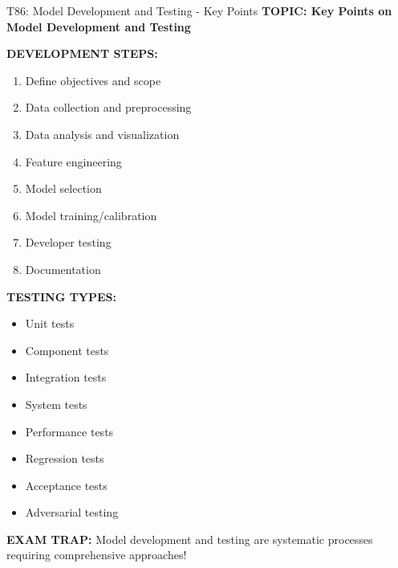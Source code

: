\documentclass[8pt]{beamer}
\begin{document}
	
	\begin{frame}{T86: Model Development and Testing - Key Points}
		\fontsize{6.5}{7.5}\selectfont
		\textbf{TOPIC: Key Points on Model Development and Testing}
		
		\vspace{0.1cm}
		\textbf{DEVELOPMENT STEPS:}
		\begin{enumerate}
			\item Define objectives and scope
			\item Data collection and preprocessing
			\item Data analysis and visualization
			\item Feature engineering
			\item Model selection
			\item Model training/calibration
			\item Developer testing
			\item Documentation
		\end{enumerate}
		
		\vspace{0.1cm}
		\textbf{TESTING TYPES:}
		\begin{itemize}
			\item Unit tests
			\item Component tests
			\item Integration tests
			\item System tests
			\item Performance tests
			\item Regression tests
			\item Acceptance tests
			\item Adversarial testing
		\end{itemize}
		
		\textcolor{myred}{\textbf{EXAM TRAP:}} Model development and testing are \textcolor{myblue}{systematic processes requiring comprehensive approaches}!
	\end{frame}
	
\end{document}
